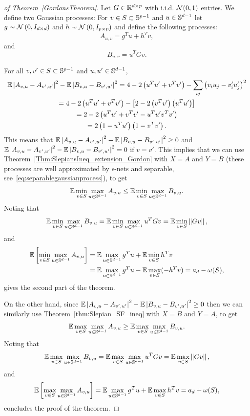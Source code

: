 \begin{proof}[of Theorem~\ref{GordonsTheorem}]

Let $G\in\mathbb{R}^{d\times p}$ with i.i.d. $\mathcal{N}(0,1)$ entries. We define two Gaussian processes: For $v\in S\subset \mathbb{S}^{p-1}$ and $u\in \mathbb{S}^{d-1}$ let $g\sim\mathcal{N}\left(0,I_{d\times d}\right)$ and $h\sim\mathcal{N}\left(0,I_{p\times p}\right)$ and define the following processes:
\[
 A_{u,v} = g^Tu + h^Tv, 
\]
and
\[
 B_{u,v} = u^T Gv. 
\]

For all $v,v'\in S \subset \mathbb{S}^{p-1}$ and $u,u'\in \mathbb{S}^{d-1}$,
\begin{gather*}
 \mathbb{E} \left| A_{v,u} - A_{v',u'} \right|^2 - \mathbb{E} \left| B_{v,u} - B_{v',u'} \right|^2  =  4 - 2\left(u^Tu' + v^Tv' \right) - \sum_{ij}\left( v_iu_j - v_i'u_j' \right)^2 \\
  =  4 - 2\left(u^Tu' + v^Tv' \right) - \left[2-  2\left(v^Tv'\right) \left(u^Tu'\right)  \right] \\
  =  2 - 2\left( u^Tu' + v^Tv' - u^Tu'v^Tv' \right) \\
  =  2\left(1-u^Tu'\right)\left(1-v^Tv'\right).
\end{gather*}
This means that $\mathbb{E} \left| A_{v,u} - A_{v',u'} \right|^2 - \mathbb{E} \left| B_{v,u} - B_{v',u'} \right|^2\geq 0$ and $\mathbb{E} \left| A_{v,u} - A_{v',u'} \right|^2 - \mathbb{E} \left| B_{v,u} - B_{v',u'} \right|^2 = 0$ if $v=v'$.
This implies that we can use Theorem~\ref{Thm:SlepiansIneq_extension_Gordon} with $X=A$ and $Y=B$ (these processes are well approximated by $\epsilon$-nets and separable, see~\eqref{eq:separablegaussianprocess}), to get
\[
 \mathbb{E} \min_{v\in S}\max_{u\in \mathbb{S}^{d-1}} A_{v,u} \leq \mathbb{E} \min_{v\in S}\max_{u\in \mathbb{S}^{d-1}} B_{v,u}.
\]
Noting that
\[
\mathbb{E} \min_{v\in S}\max_{u\in \mathbb{S}^{d-1}} B_{v,u} = \mathbb{E}\min_{v\in S}\max_{u\in \mathbb{S}^{d-1}}u^TGv =  \mathbb{E}\min_{v\in S}\left\|Gv\right\|,
\]
and
\begin{align*}
\mathbb{E} \left[\min_{v\in S}\max_{u\in \mathbb{S}^{d-1}} A_{v,u} \right] & = \mathbb{E}\max_{u\in \mathbb{S}^{d-1}}g^Tu +  \mathbb{E}\min_{v\in S}h^Tv \\
& =   \mathbb{E}\max_{u\in \mathbb{S}^{d-1}}g^Tu -\mathbb{E}\max_{v\in S}(-h^Tv) = a_d - \omega(S),
\end{align*}
gives the second part of the theorem.

On the other hand, since $\mathbb{E} \left| A_{v,u} - A_{v',u'} \right|^2 - \mathbb{E} \left| B_{v,u} - B_{v',u'} \right|^2\geq 0$ then we can similarly use Theorem~\ref{thm:Slepian_SF_ineq} with $X = B$ and $Y = A$, to get
\[
\mathbb{E} \max_{v\in S}\max_{u\in \mathbb{S}^{d-1}} A_{v,u} \geq \mathbb{E} \max_{v\in S}\max_{u\in \mathbb{S}^{d-1}} B_{v,u}.
\]
Noting that
\[
\mathbb{E} \max_{v\in S}\max_{u\in \mathbb{S}^{d-1}} B_{v,u} = \mathbb{E}\max_{v\in S}\max_{u\in \mathbb{S}^{d-1}}u^TGv =  \mathbb{E}\max_{v\in S}\left\|Gv\right\|,
\]
and
\[
\mathbb{E} \left[\max_{v\in S}\max_{u\in \mathbb{S}^{d-1}} A_{v,u} \right] = \mathbb{E}\max_{u\in \mathbb{S}^{d-1}}g^Tu +  \mathbb{E}\max_{v\in S}h^Tv = a_d + \omega(S),
\]
concludes the proof of the theorem.

\end{proof}




